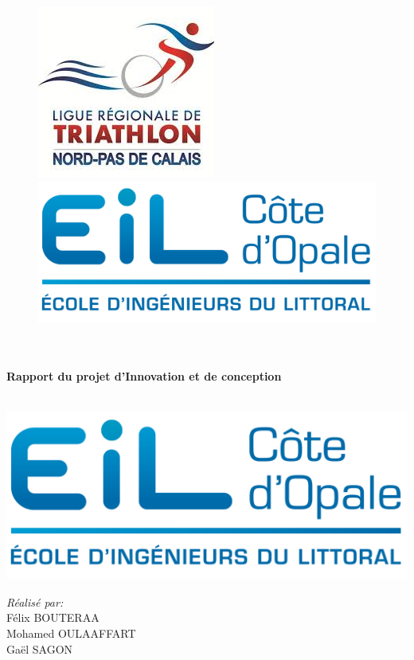 \begin{titlepage}
  \begin{sffamily}
  \begin{center}
\begin{figure}
\includegraphics[scale=0.8]{img/logo_png.png} \hfill
\includegraphics[scale=0.7]{img/eilco.png} 
\end{figure}
    \textsc{\Large }\\[1.5cm]
    \HRule \\[0.4cm]
    { \huge \bfseries Rapport du projet d'Innovation et de conception\\[0.4cm] }

    \HRule \\[2cm]
    \includegraphics[scale=1]{img/logo.png}
    \\[2cm]

    \begin{minipage}{0.4\textwidth}
      \begin{flushleft} \large
\emph{Réalisé par:} \\
Félix \textsc{BOUTERAA} \\
Mohamed \textsc{OULAAFFART} \\
Gaël \textsc{SAGON}
   

\end{flushleft}
\end{minipage}
\end{center}
\end{sffamily}
\end{titlepage}
